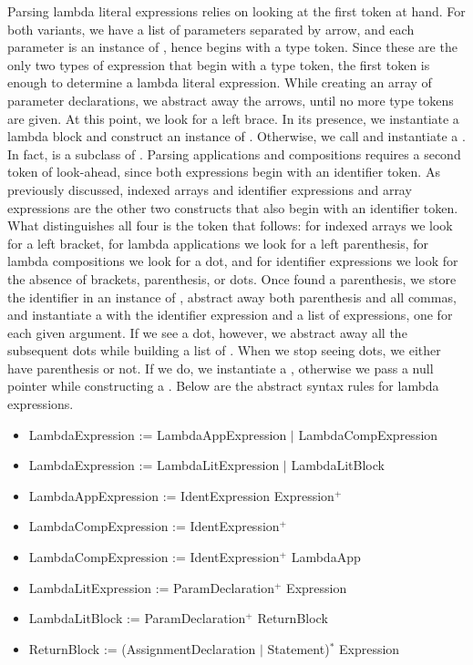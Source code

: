 Parsing lambda literal expressions relies on looking at the first token at hand. For both variants, we have a list of parameters separated by arrow, and each parameter is an instance of , hence begins with a type token. Since these are the only two types of expression that begin with a type token, the first token is enough to determine a lambda literal expression. While creating an array of parameter declarations, we abstract away the arrows, until no more type tokens are given. At this point, we look for a left brace. In its presence, we instantiate a lambda block and construct an instance of . Otherwise, we call  and instantiate a . In fact,  is a subclass of . Parsing applications and compositions requires a second token of look-ahead, since both expressions begin with an identifier token. As previously discussed, indexed arrays and identifier expressions and array expressions are the other two constructs that also begin with an identifier token. What distinguishes all four is the token that follows: for indexed arrays we look for a left bracket, for lambda applications we look for a left parenthesis, for lambda compositions we look for a dot, and for identifier expressions we look for the absence of brackets, parenthesis, or dots. Once found a parenthesis, we store the identifier in an instance of , abstract away both parenthesis and all commas, and instantiate a  with the identifier expression and a list of expressions, one for each given argument. If we see a dot, however, we abstract away all the subsequent dots while building a list of . When we stop seeing dots, we either have parenthesis or not. If we do, we instantiate a , otherwise we pass a null pointer while constructing a . Below are the abstract syntax rules for lambda expressions.

\begin{itemize}
	\item LambdaExpression := LambdaAppExpression $|$ LambdaCompExpression
	\item LambdaExpression := LambdaLitExpression $|$ LambdaLitBlock
	\item LambdaAppExpression := IdentExpression Expression$^+$
	\item LambdaCompExpression := IdentExpression$^+$
	\item LambdaCompExpression := IdentExpression$^+$ LambdaApp
	\item LambdaLitExpression := ParamDeclaration$^+$ Expression
	\item LambdaLitBlock := ParamDeclaration$^+$ ReturnBlock
	\item ReturnBlock := (AssignmentDeclaration $|$ Statement)$^*$ Expression
\end{itemize}

